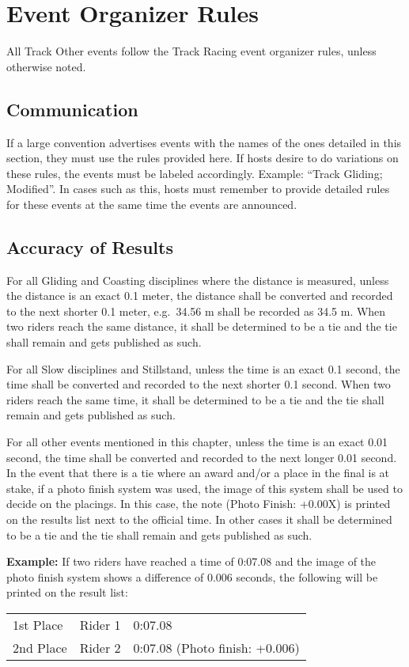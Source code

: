 \chapter{Event Organizer Rules}

All Track Other events follow the Track Racing event organizer rules, unless otherwise noted.

\section{Communication}

If a large convention advertises events with the names of the ones detailed in this section, they must use the rules provided here.
If hosts desire to do variations on these rules, the events must be labeled accordingly.
Example: ``Track Gliding; Modified''.
In cases such as this, hosts must remember to provide detailed rules for these events at the same time the events are announced.


\section{Accuracy of Results}

For all Gliding and Coasting disciplines where the distance is measured, unless the distance is an exact 0.1 meter, the distance shall be converted and recorded to the next shorter 0.1 meter, e.g.\ 34.56 m shall be recorded as 34.5 m.
When two riders reach the same distance, it shall be determined to be a tie and the tie shall remain and gets published as such.

For all Slow disciplines and Stillstand, unless the time is an exact 0.1 second, the time shall be converted and recorded to the next shorter 0.1 second.
When two riders reach the same time, it shall be determined to be a tie and the tie shall remain and gets published as such.

For all other events mentioned in this chapter, unless the time is an exact 0.01 second, the time shall be converted and recorded to the next longer 0.01 second.
In the event that there is a tie where an award and/or a place in the final is at stake, if a photo finish system was used, the image of this system shall be used to decide on the placings.
In this case, the note (Photo Finish: +0.00X) is printed on the results list next to the official time. In other cases it shall be determined to be a tie and the tie shall remain and gets published as such.

\textbf{Example:} If two riders have reached a time of 0:07.08 and the image of the photo finish system shows a difference of 0.006 seconds, the following will be printed on the result list:\\
\begin{tabular}{l l l}
1st Place & Rider 1 & 0:07.08 \\
2nd Place & Rider 2 & 0:07.08 (Photo finish: +0.006)\\
\end{tabular}
